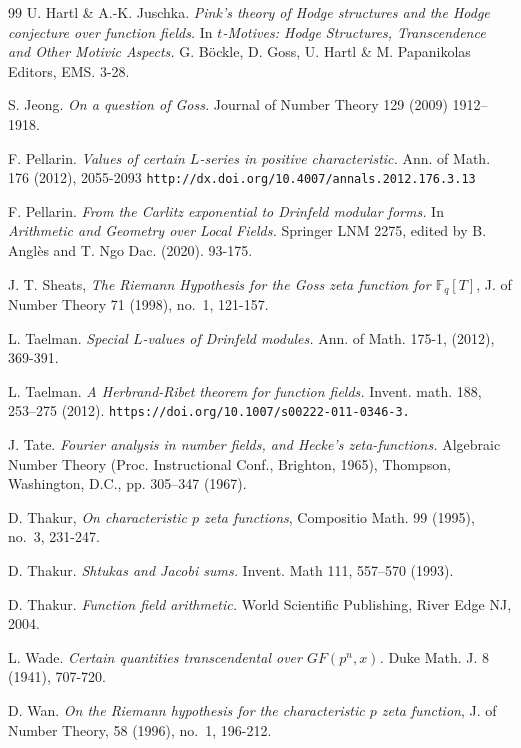 \documentclass[11pt]{amsart}
\numberwithin{equation}{section}
\begin{document}
\begin{thebibliography}{99}
 U. Hartl \& A.-K. Juschka. {\em Pink's theory of Hodge structures and the Hodge conjecture over function fields.} In {\em $t$-Motives: Hodge Structures, Transcendence and Other Motivic Aspects.} G. B\"ockle, D. Goss, U. Hartl \& M. Papanikolas Editors, EMS. 3-28.

 S. Jeong. {\em On a question of Goss.} Journal of Number Theory 129 (2009) 1912--1918.

 F. Pellarin. {\em Values of certain $L$-series in positive characteristic.} Ann. of Math. 176 (2012), 2055-2093 {\tt http://dx.doi.org/10.4007/annals.2012.176.3.13}

 F. Pellarin. {\em From the Carlitz exponential to Drinfeld modular forms.} In {\em Arithmetic and Geometry over Local Fields.} Springer LNM 2275, edited by B. Angl\`es and T. Ngo Dac. (2020). 93-175.

 J. T. Sheats, {\em The Riemann Hypothesis for the Goss zeta function for $\mathbb{F}_{q}[T]$}, J. of Number Theory 71 (1998), no.~1, 121-157.

 L. Taelman. {\em Special $L$-values of Drinfeld modules.} Ann. of Math. 175-1, (2012), 369-391.

 L. Taelman. {\em A Herbrand-Ribet theorem for function fields.} Invent. math. 188, 253--275 (2012). {\tt https://doi.org/10.1007/s00222-011-0346-3.}

 J. Tate. {\em Fourier analysis in number fields, and Hecke's zeta-functions.} Algebraic Number Theory (Proc. Instructional Conf., Brighton, 1965), Thompson, Washington, D.C., pp. 305--347 (1967).

 D. Thakur, {\em On characteristic $p$ zeta functions}, Compositio Math. 99 (1995), no.~3, 231-247.

 D. Thakur. {\em Shtukas and Jacobi sums.} Invent. Math 111, 557--570 (1993).

 D. Thakur. {\em Function field arithmetic.} World Scientific Publishing, River Edge NJ, 2004.

 L. Wade. {\em Certain quantities transcendental over $GF(p^n
, x)$.} Duke Math. J.
8 (1941), 707-720.

 D. Wan. {\em On the Riemann hypothesis for the characteristic $p$ zeta function}, J. of Number Theory, 58 (1996), no.~1, 196-212.

\end{thebibliography}
\end{document}
